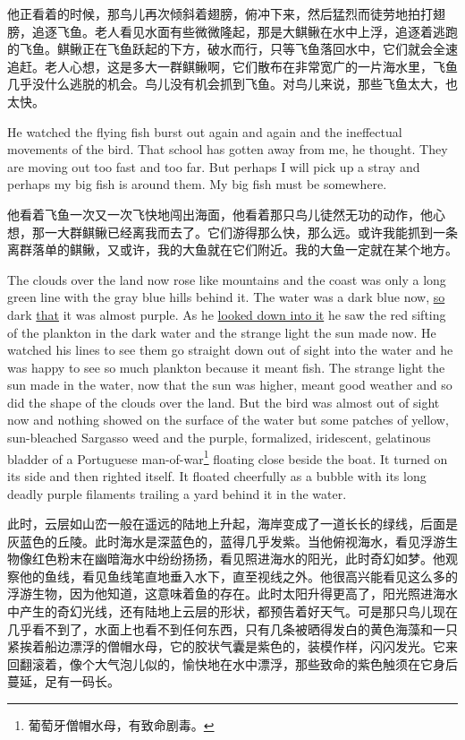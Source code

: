 \begin{paracol}{2}
\switchcolumn

他正看着的时候，那鸟儿再次倾斜着翅膀，俯冲下来，然后猛烈而徒劳地拍打翅膀，追逐飞鱼。老人看见水面有些微微隆起，那是大鲯鳅在水中上浮，追逐着逃跑的飞鱼。鲯鳅正在飞鱼跃起的下方，破水而行，只等飞鱼落回水中，它们就会全速追赶。老人心想，这是多大一群鲯鳅啊，它们散布在非常宽广的一片海水里，飞鱼几乎没什么逃脱的机会。鸟儿没有机会抓到飞鱼。对鸟儿来说，那些飞鱼太大，也太快。

\switchcolumn*

He watched the flying fish \gls{burst} out again and again and the
\gls{ineffectual} movements of the bird. That school has gotten away from
me, he thought. They are moving out too fast and too far. But perhaps I will
pick up a \gls{stray} and perhaps my big fish is around them. My big fish must be
somewhere.

\switchcolumn

他看着飞鱼一次又一次飞快地闯出海面，他看着那只鸟儿徒然无功的动作，他心想，那一大群鲯鳅已经离我而去了。它们游得那么快，那么远。或许我能抓到一条离群落单的鲯鳅，又或许，我的大鱼就在它们附近。我的大鱼一定就在某个地方。

\switchcolumn*

The clouds over the land now rose like mountains and the coast was only a
long green line with the gray blue hills behind it. The water was a dark
blue now, \uline{so} dark \uline{that} it was almost purple. As he \uline{looked down into it}
he saw the red sifting of the \gls{plankton} in the dark water and the
strange light the sun made now. He watched his lines to see them go straight
down out of sight into the water and he was happy to see so much plankton
because it \gls{meant} fish. The strange light the sun made in the water,
now that the sun was higher, meant good weather and so did the shape of the
clouds over the land. But the bird was almost out of sight now and nothing
showed on the surface of the water but some patches of yellow,
sun-\gls{bleached} \gls{Sargasso} \gls{weed} and the purple,
\gls{formalized}, \gls{iridescent}, \gls{gelatinous} \gls{bladder} of a
Portuguese man-of-war\footnote{葡萄牙僧帽水母，有致命剧毒。} floating close
beside the boat. It turned on its side and then righted itself. It floated
cheerfully as a \gls{bubble} with its long deadly purple \glspl{filament}
\gls{trailing} a \gls{yard} behind it in the water.

\switchcolumn

此时，云层如山峦一般在遥远的陆地上升起，海岸变成了一道长长的绿线，后面是灰蓝色的丘陵。此时海水是深蓝色的，蓝得几乎发紫。当他俯视海水，看见浮游生物像红色粉末在幽暗海水中纷纷扬扬，看见照进海水的阳光，此时奇幻如梦。他观察他的鱼线，看见鱼线笔直地垂入水下，直至视线之外。他很高兴能看见这么多的浮游生物，因为他知道，这意味着鱼的存在。此时太阳升得更高了，阳光照进海水中产生的奇幻光线，还有陆地上云层的形状，都预告着好天气。可是那只鸟儿现在几乎看不到了，水面上也看不到任何东西，只有几条被晒得发白的黄色海藻和一只紧挨着船边漂浮的僧帽水母，它的胶状气囊是紫色的，装模作样，闪闪发光。它来回翻滚着，像个大气泡儿似的，愉快地在水中漂浮，那些致命的紫色触须在它身后蔓延，足有一码长。


\end{paracol}
